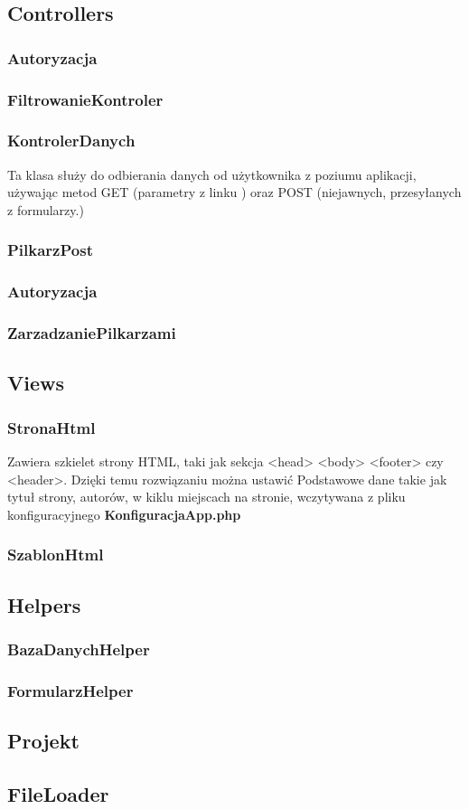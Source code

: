     \subsection{Controllers}
        \subsubsection{Autoryzacja}
        \subsubsection{FiltrowanieKontroler}
        \subsubsection{KontrolerDanych}
            Ta klasa służy do odbierania danych od użytkownika z poziumu aplikacji, używając metod GET (parametry z linku ) oraz POST (niejawnych, przesyłanych z formularzy.)
        \subsubsection{PilkarzPost}
        \subsubsection{Autoryzacja}
        \subsubsection{ZarzadzaniePilkarzami}

    \subsection{Views}
        \subsubsection{StronaHtml}
        Zawiera szkielet strony HTML, taki jak sekcja <head> <body> <footer> czy <header>. Dzięki temu rozwiązaniu można ustawić Podstawowe dane takie jak tytuł strony, autorów, w kiklu miejscach na stronie, wczytywana z pliku konfiguracyjnego \textbf{KonfiguracjaApp.php}
        \subsubsection{SzablonHtml}

    \subsection{Helpers}
        \subsubsection{BazaDanychHelper}
        \subsubsection{FormularzHelper}
        
    \subsection{Projekt}
          

    \subsection{FileLoader}